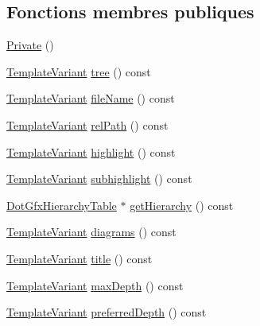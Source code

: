 \subsection*{Fonctions membres publiques}
\begin{DoxyCompactItemize}
\item 
\hyperlink{class_class_hierarchy_context_1_1_private_a19c1d97702606e563c2c8b0edaeb5242}{Private} ()
\item 
\hyperlink{class_template_variant}{Template\+Variant} \hyperlink{class_class_hierarchy_context_1_1_private_a37b4813183a673f3a9fd9baaf8553960}{tree} () const 
\item 
\hyperlink{class_template_variant}{Template\+Variant} \hyperlink{class_class_hierarchy_context_1_1_private_a3ba1d5d0e2c48e7e82470a9e0795a8f9}{file\+Name} () const 
\item 
\hyperlink{class_template_variant}{Template\+Variant} \hyperlink{class_class_hierarchy_context_1_1_private_afae29dab01329e5a103ac38c43cf8a13}{rel\+Path} () const 
\item 
\hyperlink{class_template_variant}{Template\+Variant} \hyperlink{class_class_hierarchy_context_1_1_private_ac1843dc85253954145cf88144bba5f91}{highlight} () const 
\item 
\hyperlink{class_template_variant}{Template\+Variant} \hyperlink{class_class_hierarchy_context_1_1_private_a1913344a56840e9e2889f42da129d6e8}{subhighlight} () const 
\item 
\hyperlink{class_dot_gfx_hierarchy_table}{Dot\+Gfx\+Hierarchy\+Table} $\ast$ \hyperlink{class_class_hierarchy_context_1_1_private_acb8e478c6d663f2855c69acc85592257}{get\+Hierarchy} () const 
\item 
\hyperlink{class_template_variant}{Template\+Variant} \hyperlink{class_class_hierarchy_context_1_1_private_a3b7b572bb8875cd946040571b2eb92b4}{diagrams} () const 
\item 
\hyperlink{class_template_variant}{Template\+Variant} \hyperlink{class_class_hierarchy_context_1_1_private_a3084120f9dff2e1cc67fed6dcecd1793}{title} () const 
\item 
\hyperlink{class_template_variant}{Template\+Variant} \hyperlink{class_class_hierarchy_context_1_1_private_a71660e3d2e85598ab167c6448c5fd271}{max\+Depth} () const 
\item 
\hyperlink{class_template_variant}{Template\+Variant} \hyperlink{class_class_hierarchy_context_1_1_private_a0bacf80400929d8a4802d07f7462974a}{preferred\+Depth} () const 
\end{DoxyCompactItemize}


